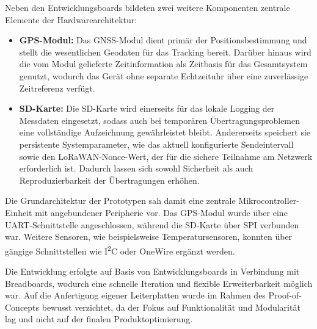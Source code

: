 Neben den Entwicklungsboards bildeten zwei weitere Komponenten zentrale Elemente der Hardwarearchitektur:  
\begin{itemize}
    \item \textbf{GPS-Modul:} Das GNSS-Modul dient primär der Positionsbestimmung und stellt die wesentlichen Geodaten für das Tracking bereit. Darüber hinaus wird die vom Modul gelieferte Zeitinformation als Zeitbasis für das Gesamtsystem genutzt, wodurch das Gerät ohne separate Echtzeituhr über eine zuverlässige Zeitreferenz verfügt. 
    \item \textbf{SD-Karte:} Die SD-Karte wird einerseits für das lokale Logging der Messdaten eingesetzt, sodass auch bei temporären Übertragungsproblemen eine vollständige Aufzeichnung gewährleistet bleibt. Andererseits speichert sie persistente Systemparameter, wie das aktuell konfigurierte Sendeintervall sowie den LoRaWAN-Nonce-Wert, der für die sichere Teilnahme am Netzwerk erforderlich ist. Dadurch lassen sich sowohl Sicherheit als auch Reproduzierbarkeit der Übertragungen erhöhen.
\end{itemize}

Die Grundarchitektur der Prototypen sah damit eine zentrale Mikrocontroller-Einheit mit angebundener Peripherie vor. Das GPS-Modul wurde über eine UART-Schnittstelle angeschlossen, während die SD-Karte über SPI verbunden war. Weitere Sensoren, wie beispielsweise Temperatursensoren, konnten über gängige Schnittstellen wie I\textsuperscript{2}C oder OneWire ergänzt werden. 

Die Entwicklung erfolgte auf Basis von Entwicklungsboards in Verbindung mit Breadboards, wodurch eine schnelle Iteration und flexible Erweiterbarkeit möglich war. Auf die Anfertigung eigener Leiterplatten wurde im Rahmen des Proof-of-Concepts bewusst verzichtet, da der Fokus auf Funktionalität und Modularität lag und nicht auf der finalen Produktoptimierung.